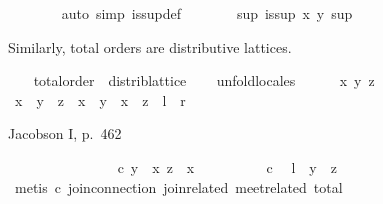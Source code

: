 \begin{isabellebody}
\ \ \ \ \ \ \isamarkupfalse%
\ {\isacharparenleft}auto\ simp{\isacharcolon}\ is{\isacharunderscore}sup{\isacharunderscore}def{\isacharparenright}\isanewline
\ \ \ \ \isamarkupfalse%
\ \isamarkupfalse%
\ {\isachardoublequoteopen}{\isasymexists}sup{\isachardot}\ is{\isacharunderscore}sup\ x\ y\ sup{\isachardoublequoteclose}\ \isacommand{{\isachardot}{\isachardot}}\isamarkupfalse%
%
\endisataginvisible
{\isafoldinvisible}%
%
\isadeliminvisible
%
\endisadeliminvisible
%
\isadelimvisible
\ %
\endisadelimvisible
%
\isatagvisible
{}\isamarkupfalse%
%
\endisatagvisible
{\isafoldvisible}%
%
\isadelimvisible
%
\endisadelimvisible
%
\begin{isamarkuptext}%
Similarly, total orders are distributive lattices.%
\end{isamarkuptext}%
\isamarkuptrue%
\ \ \isamarkupfalse%
\ total{\isacharunderscore}order\ {\isasymsubseteq}\ distrib{\isacharunderscore}lattice\isanewline
%
\isadelimproof
\ \ %
\endisadelimproof
%
\isatagproof
{}\isamarkupfalse%
\ unfold{\isacharunderscore}locales\isanewline
\ \ \ \ \isamarkupfalse%
\ x\ y\ z\isanewline
\ \ \ \ \isamarkupfalse%
\ {\isachardoublequoteopen}x\ {\isasymsqinter}\ {\isacharparenleft}y\ {\isasymsqunion}\ z{\isacharparenright}\ {\isacharequal}\ x\ {\isasymsqinter}\ y\ {\isasymsqunion}\ x\ {\isasymsqinter}\ z{\isachardoublequoteclose}\ {\isacharparenleft}\ {\isachardoublequoteopen}{\isacharquery}l\ {\isacharequal}\ {\isacharquery}r{\isachardoublequoteclose}{\isacharparenright}%
\begin{isamarkuptxt}%
Jacobson I, p.\ 462%
\end{isamarkuptxt}%
\isamarkuptrue%
\ \ \ \ \isamarkupfalse%
\ {\isacharminus}\isanewline
\ \ \ \ \ \ \isacommand{{\isacharbraceleft}}\isamarkupfalse%
\ \isamarkupfalse%
\ c{\isacharcolon}\ {\isachardoublequoteopen}y\ {\isasymsqsubseteq}\ x{\isachardoublequoteclose}\ {\isachardoublequoteopen}z\ {\isasymsqsubseteq}\ x{\isachardoublequoteclose}\isanewline
\ \ \ \ \ \ \ \ \isamarkupfalse%
\ c\ \isamarkupfalse%
\ {\isachardoublequoteopen}{\isacharquery}l\ {\isacharequal}\ y\ {\isasymsqunion}\ z{\isachardoublequoteclose}\isanewline
\ \ \ \ \ \ \ \ \ \ \isamarkupfalse%
\ {\isacharparenleft}metis\ c\ join{\isacharunderscore}connection{}\ join{\isacharunderscore}related{}\ meet{\isacharunderscore}related{}\ total{\isacharparenright}\isanewline

\end{isabellebody}
